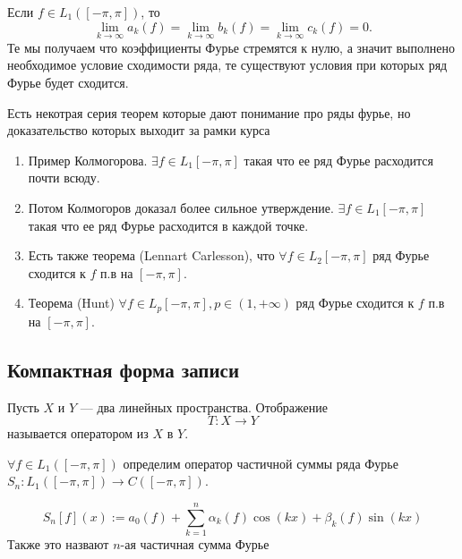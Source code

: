 \begin{corollary}
Если $f \in L_{1}([-\pi,\pi])$, то 
$$
\lim\limits_{k \to \infty}a_{k}(f) = \lim\limits_{k \to \infty}b_{k}(f) = \lim\limits_{k \to \infty}c_{k}(f) = 0.
$$
Те мы получаем что коэффициенты Фурье стремятся к нулю, а значит выполнено необходимое условие сходимости ряда, те существуют условия при которых ряд Фурье будет сходится.

\end{corollary}
\begin{note}
    Есть некотрая серия теорем которые дают понимание про ряды фурье, но доказательство которых выходит за рамки курса
    \begin{enumerate}
        \item Пример Колмогорова. $\exists f \in L_1[-\pi,\pi]$ такая что ее ряд Фурье расходится почти всюду.
        \item Потом Колмогоров доказал более сильное утверждение. $\exists f \in L_1[-\pi,\pi]$ такая что ее ряд Фурье расходится в каждой точке.
        \item  Есть также теорема (Lennart Carlesson), что $\forall f \in L_2[-\pi,\pi]$ ряд Фурье сходится к $f$ п.в на $[-\pi,\pi]$.
        \item Теорема (Hunt) $\forall f \in L_p[-\pi,\pi], p \in (1, +\infty)$ ряд Фурье сходится к $f$ п.в на $[-\pi,\pi]$.
    \end{enumerate}



\end{note}

\subsection{Компактная форма записи}
\begin{definition}
    Пусть \( X \) и \( Y \) — два линейных пространства. Отображение
\[
T \colon X \to Y
\]
называется оператором из \( X \) в \( Y \).
\end{definition}

\begin{definition}
$\forall f \in L_1\left([-\pi, \pi]\right)$ определим оператор частичной суммы ряда Фурье $S_n \colon L_1\left([-\pi, \pi]\right) \to C \left([-\pi, \pi]\right)$.

\[
S_n[f](x) := a_0(f) + \sum_{k=1}^{n} \alpha_k(f) \cos(kx) + \beta_k(f) \sin(kx)
\]
Также это назвают $n$-ая частичная сумма Фурье
\end{definition}


